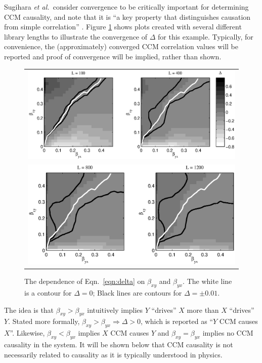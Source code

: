 \documentclass[twocolumn,aps,pre,groupedaddress]{revtex4-1}
\begin{document}
Sugihara {\em et al.\ }consider convergence to be critically important for determining CCM causality, and note that it is ``a key property that distinguishes causation from simple correlation'' \cite{Sugihara2012}.  Figure \ref{fig:BGridPlot} shows plots created with several different library lengths to illustrate the convergence of $\Delta$ for this example.  Typically, for convenience, the (approximately) converged CCM correlation values will be reported and proof of convergence will be implied, rather than shown.
\begin{figure}[ht]
\begin{tabular}{l}
\includegraphics[scale=0.5]{Figure1A.eps}\\
\includegraphics[scale=0.5]{Figure1B.eps}
\end{tabular}
\caption{The dependence of Eqn.\ \ref{eqn:delta} on $\beta_{xy}$ and $\beta_{yx}$.  The white line is a contour for $\Delta=0$; Black lines are contours for $\Delta=\pm 0.01$.}
\label{fig:BGridPlot}
\end{figure}

The idea is that $\beta_{xy}>\beta_{yx}$ intuitively implies $Y$ ``drives'' $X$ more than $X$ ``drives'' $Y$.  Stated more formally, $\beta_{xy}>\beta_{yx}\Rightarrow\Delta>0$, which is reported as ``$Y$ CCM causes $X$''.  Likewise, $\beta_{xy}<\beta_{yx}$ implies $X$ CCM causes $Y$ and $\beta_{xy}=\beta_{yx}$ implies no CCM causality in the system.  It will be shown below that CCM causality is not necessarily related to causality as it is typically understood in physics.
\end{document}
